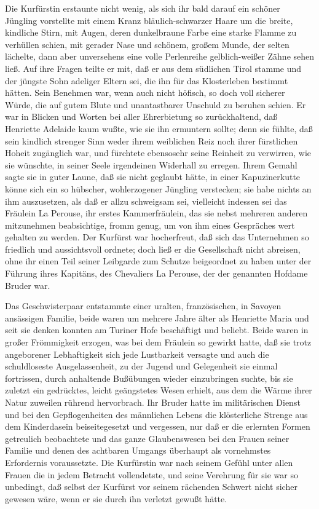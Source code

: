 \pagenum{[107]}Die Kurfürstin erstaunte nicht wenig, als sich ihr
bald darauf ein schöner Jüngling vorstellte mit einem Kranz
bläulich-schwarzer Haare um die breite, kindliche Stirn, mit Augen,
deren dunkelbraune Farbe eine starke Flamme zu verhüllen schien,
mit gerader Nase und schönem, großem Munde, der selten lächelte,
dann aber unversehens eine volle Perlenreihe gelblich-weißer Zähne
sehen ließ. Auf ihre Fragen teilte er mit, daß er aus dem südlichen
Tirol stamme und der jüngste Sohn adeliger Eltern sei, die ihn für
das Klosterleben bestimmt hätten. Sein Benehmen war, wenn auch
nicht höfisch, so doch voll sicherer Würde, die auf gutem Blute und
unantastbarer Unschuld zu beruhen schien. Er war in Blicken und
Worten bei aller Ehrerbietung so zurückhaltend, daß Henriette
Adelaide kaum wußte, wie sie ihn ermuntern sollte; denn sie fühlte,
daß sein kindlich strenger Sinn weder ihrem weiblichen Reiz noch
ihrer fürstlichen Hoheit zugänglich war, und fürchtete ebensosehr
seine Reinheit zu verwirren, wie sie wünschte, in seiner Seele
irgendeinen Widerhall zu erregen. Ihrem Gemahl sagte sie in guter
Laune, daß sie nicht geglaubt hätte, in einer Kapuzinerkutte könne
sich ein so hübscher, wohlerzogener Jüngling verstecken; sie habe
nichts an ihm auszusetzen, als daß er allzu schweigsam sei,
vielleicht indessen sei das Fräulein La Perouse, ihr erstes
Kammerfräulein, das sie nebst mehreren anderen mitzunehmen
beabsichtige, fromm genug, um von ihm eines Gespräches wert
gehalten zu werden. Der Kurfürst war hocherfreut, daß sich das
Unternehmen so friedlich und aussichtsvoll ordnete; doch ließ er
die Gesellschaft nicht abreisen, ohne ihr einen Teil seiner
Leibgarde zum Schutze beigeordnet zu haben unter der Führung ihres
Kapitäns, des Chevaliers La Perouse, der der genannten Hofdame
Bruder war.

\pagenum{[108]}Das Geschwisterpaar entstammte einer uralten,
französischen, in Savoyen ansässigen Familie, beide waren um
mehrere Jahre älter als Henriette Maria und seit sie denken konnten
am Turiner Hofe beschäftigt und beliebt. Beide waren in großer
Frömmigkeit erzogen, was bei dem Fräulein so gewirkt hatte, daß sie
trotz angeborener Lebhaftigkeit sich jede Lustbarkeit versagte und
auch die schuldloseste Ausgelassenheit, zu der Jugend und
Gelegenheit sie einmal fortrissen, durch anhaltende Bußübungen
wieder einzubringen suchte, bis sie zuletzt ein gedrücktes, leicht
geängstetes Wesen erhielt, aus dem die Wärme ihrer Natur zuweilen
rührend hervorbrach. Ihr Bruder hatte im militärischen Dienst und
bei den Gepflogenheiten des männlichen Lebens die klösterliche
Strenge aus dem Kinderdasein beiseitegesetzt und vergessen, nur daß
er die erlernten Formen getreulich beobachtete und das ganze
Glaubenswesen bei den Frauen seiner Familie und denen des achtbaren
Umgangs überhaupt als vornehmstes Erfordernis voraussetzte. Die
Kurfürstin war nach seinem Gefühl unter allen Frauen die in jedem
Betracht vollendetste, und seine Verehrung für sie war so
unbedingt, daß selbst der Kurfürst vor seinem rächenden Schwert
nicht sicher gewesen wäre, wenn er sie durch ihn verletzt gewußt
hätte.

